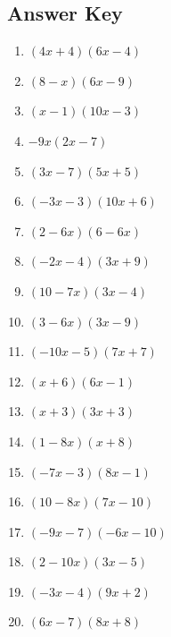 \documentclass{article}
\begin{document}
\newpage

\subsection*{Answer Key}

\begin{enumerate}
\item $\displaystyle \left(4 x + 4\right) \left(6 x - 4\right) $ \ 
\item $\displaystyle \left(8 - x\right) \left(6 x - 9\right) $ \ 
\item $\displaystyle \left(x - 1\right) \left(10 x - 3\right) $ \ 
\item $\displaystyle - 9 x \left(2 x - 7\right) $ \ 
\item $\displaystyle \left(3 x - 7\right) \left(5 x + 5\right) $ \ 
\item $\displaystyle \left(- 3 x - 3\right) \left(10 x + 6\right) $ \ 
\item $\displaystyle \left(2 - 6 x\right) \left(6 - 6 x\right) $ \ 
\item $\displaystyle \left(- 2 x - 4\right) \left(3 x + 9\right) $ \ 
\item $\displaystyle \left(10 - 7 x\right) \left(3 x - 4\right) $ \ 
\item $\displaystyle \left(3 - 6 x\right) \left(3 x - 9\right) $ \ 
\item $\displaystyle \left(- 10 x - 5\right) \left(7 x + 7\right) $ \ 
\item $\displaystyle \left(x + 6\right) \left(6 x - 1\right) $ \ 
\item $\displaystyle \left(x + 3\right) \left(3 x + 3\right) $ \ 
\item $\displaystyle \left(1 - 8 x\right) \left(x + 8\right) $ \ 
\item $\displaystyle \left(- 7 x - 3\right) \left(8 x - 1\right) $ \ 
\item $\displaystyle \left(10 - 8 x\right) \left(7 x - 10\right) $ \ 
\item $\displaystyle \left(- 9 x - 7\right) \left(- 6 x - 10\right) $ \ 
\item $\displaystyle \left(2 - 10 x\right) \left(3 x - 5\right) $ \ 
\item $\displaystyle \left(- 3 x - 4\right) \left(9 x + 2\right) $ \ 
\item $\displaystyle \left(6 x - 7\right) \left(8 x + 8\right) $ \ 

\end{enumerate}
\end{document}
